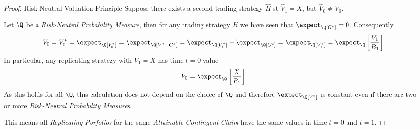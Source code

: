 \documentclass[11pt,a4paper]{article}
\begin{document}
  \begin{proof}{Risk-Neutral Valuation Principle}
    Suppose there exists a second trading strategy $\hat{H}$ st $\hat{V}_1=X$, but $\hat{V}_0\neq V_0$.
    \par Let $\Q$ be a \textit{Risk-Neutral Probability Measure}, then for any trading strategy $H$ we have seen that $\expect_\Q[G^*]=0$. Consequently
    \[ V_0=V_0^*=\expect_\Q[V_0^*]=\expect_\Q[V_1^*-G^*]=\expect_\Q[V_1^*]-\expect_\Q[G^*]=\expect_\Q[V_1^*]=\expect_\Q\left[\frac{V_1}{B_1}\right] \]
    In particular, any replicating strategy with $V_1=X$ has time $t=0$ value
    \[ V_0=\expect_\Q\left[\frac{X}{B_1}\right] \]
    As this holds for all $\Q$, this calculation does not depend on the choice of $\Q$ and therefore $\expect_\Q[V_1^*]$ is constant even if there are two or more \textit{Risk-Neutral Probability Measures}.
    \par This means all \textit{Replicating Porfolios} for the same \textit{Attainable Contingent Claim} have the same values in time $t=0$ and $t=1$.
  \end{proof}
\end{document}
